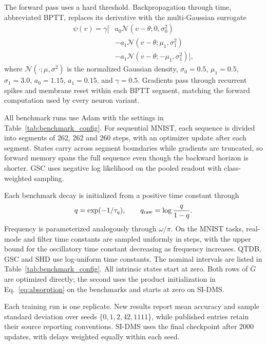 \documentclass[letterpaper,journal]{IEEEtran}
\begin{document}
The forward pass uses a hard threshold. Backpropagation through time, abbreviated BPTT, replaces its derivative with the multi-Gaussian surrogate~\cite{asrnn}
\begin{equation}
\begin{aligned}
\psi(v)=\gamma\big[&
a_0\mathcal N(v-\theta;0,\sigma_0^2)\\
&-a_1\mathcal N(v-\theta;\mu_1,\sigma_1^2)\\
&-a_1\mathcal N(v-\theta;-\mu_1,\sigma_1^2)\big],
\end{aligned}
\label{eq:surrogate}
\end{equation}
where $\mathcal N(\cdot;\mu,\sigma^2)$ is the normalized Gaussian density,
$\sigma_0=0.5$, $\mu_1=0.5$, $\sigma_1=3.0$,
$a_0=1.15$, $a_1=0.15$, and $\gamma=0.5$.
Gradients pass through recurrent spikes and membrane reset within each BPTT segment, matching the forward computation used by every neuron variant.

All benchmark runs use Adam with the settings in Table~\ref{tab:benchmark_config}. For sequential MNIST, each sequence is divided into segments of 262, 262 and 260 steps, with an optimizer update after each segment. States carry across segment boundaries while gradients are truncated, so forward memory spans the full sequence even though the backward horizon is shorter. GSC uses negative log likelihood on the pooled readout with class-weighted sampling.

Each benchmark decay is initialized from a positive time constant through
\begin{equation}
q=\exp(-1/\tau_q),\qquad q_{\rm raw}=\log\frac{q}{1-q}.
\label{eq:decay_init}
\end{equation}
Frequency is parameterized analogously through $\omega/\pi$. On the MNIST tasks, real-mode and filter time constants are sampled uniformly in steps, with the upper bound for the oscillatory time constant decreasing as frequency increases. QTDB, GSC and SHD use log-uniform time constants. The nominal intervals are listed in Table~\ref{tab:benchmark_config}. All intrinsic states start at zero. Both rows of $\bar G$ are optimized directly; the second uses the product initialization in Eq.~\eqref{eq:absorption} on the benchmarks and starts at zero on SI-DMS.

Each training run is one replicate. New results report mean accuracy and sample standard deviation over seeds $\{0,1,2,42,1111\}$, while published entries retain their source reporting conventions. SI-DMS uses the final checkpoint after 2000 updates, with delays weighted equally within each seed.
\end{document}
